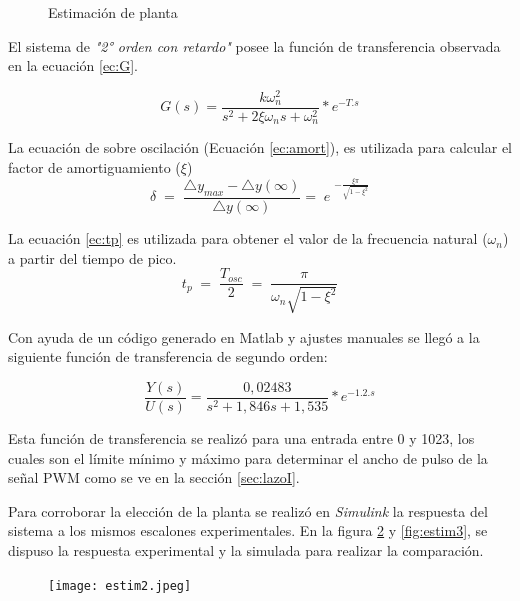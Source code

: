     \begin{figure}[H]
    	\centering
    	\caption{Estimación de planta} \label{fig:pl2}
    \end{figure}

El sistema de \textit{"2° orden con retardo"} posee la función de transferencia observada en la ecuación \ref{ec:G}.

 \begin{equation}
 	G(s)=\frac{k\omega_n^2}{s^2+2\xi\omega_ns+\omega_n^2}\ast e^{-T.s}
 	\label{ec:G}
 \end{equation}

La ecuación de sobre oscilación (Ecuación \ref{ec:amort}), es utilizada para calcular el factor de amortiguamiento ($\xi$)
\begin{equation}
	\delta\;=\;\frac{\triangle y_{max}-\triangle y\left(\infty\right)}{\triangle y\left(\infty\right)}=\;e\;^{-\frac{\xi\pi}{\sqrt{1-\xi^2}}}
	\label{ec:amort}
\end{equation}

La ecuación \ref{ec:tp} es utilizada para obtener el valor de la frecuencia natural ($\omega_n$) a partir del tiempo de pico.
\begin{equation}
t_p\;=\;\frac{T_{osc}}2\;=\;\frac\pi{\omega_n\sqrt{1-\xi^2}}
\label{ec:tp}
\end{equation}

    
    Con ayuda de un código generado en Matlab y ajustes manuales se llegó a la siguiente función de transferencia de segundo orden:
    
    \begin{equation}
    	\frac{Y(s)}{U(s)}=\frac{0,02483}{s^2+1,846s+1,535}*e^{-1.2.s}
    \end{equation}
   
    Esta función de transferencia se realizó para una entrada entre 0 y 1023, los cuales son el límite mínimo y máximo para determinar el ancho de pulso de la señal PWM como se ve en la sección \ref{sec:lazoI}.
    
    Para corroborar la elección de la planta se realizó en \textit{Simulink} la respuesta del sistema a los mismos escalones experimentales. En la figura \ref{fig:estim2} y \ref{fig:estim3}, se dispuso la respuesta experimental y la simulada para realizar la comparación.
    
    \begin{figure}[H]
    	\centering
    	\texttt{[image: estim2.jpeg]}
    	\label{fig:estim2}
    \end{figure}

